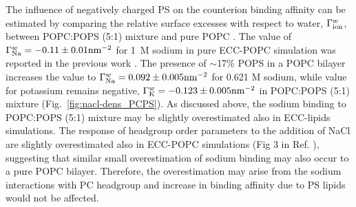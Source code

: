 \documentclass[journal=jpcbfk,manuscript=article]{achemso}
\begin{document}
% 
%
The influence of negatively charged PS on the counterion binding affinity can be estimated 
by comparing the relative surface excesses with respect to water, $\Gamma ^{w} _{\rm ion}$,
between POPC:POPS (5:1) mixture and pure POPC \cite{melcr18}.
The value of $\Gamma ^{w} _{\rm Na}=-0.11 \pm 0.01 \mathrm{nm}^{-2}$ for 1~M sodium in pure ECC-POPC
simulation was reported in the previous work \cite{melcr18}.
The presence of $\sim$17\% POPS in a POPC bilayer increases the
value to $\Gamma ^{w} _{\rm Na}=0.092 \pm 0.005 \mathrm{nm}^{-2}$ 
for 0.621 M sodium, while value for potassium remains negative,
$\Gamma ^{w} _{\rm K}=-0.123 \pm 0.005 \mathrm{nm}^{-2}$ in POPC:POPS (5:1) mixture (Fig.~\ref{fig:nacl-dens_PCPS}).
As discussed above, the sodium binding to POPC:POPS (5:1) mixture may be slightly overestimated also in
ECC-lipids simulations. The response of headgroup order parameters to the addition of NaCl are
slightly overestimated also in ECC-POPC simulations (Fig 3 in Ref. ),
suggesting that similar small overestimation of sodium binding may also occur to a pure POPC bilayer.
Therefore, the overestimation may arise from the sodium interactions with PC headgroup and
increase in binding affinity due to PS lipids would not be affected.
\end{document}
